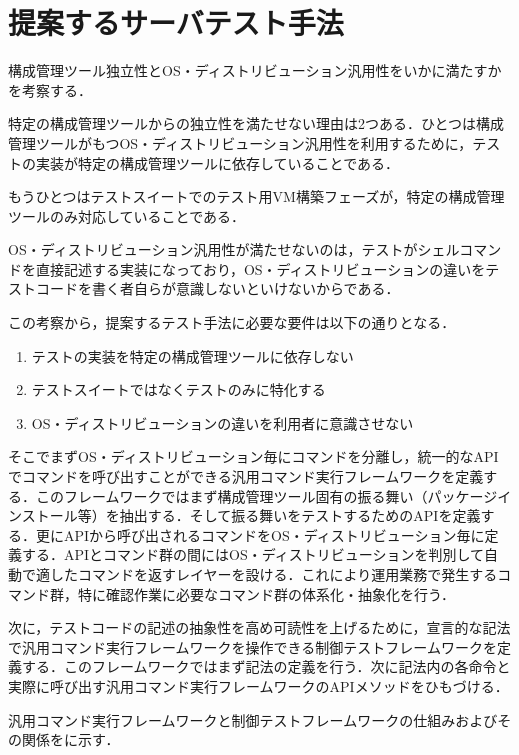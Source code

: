 \section{提案するサーバテスト手法}

構成管理ツール独立性とOS・ディストリビューション汎用性をいかに満たすかを考察する．

特定の構成管理ツールからの独立性を満たせない理由は2つある．ひとつは構成管理ツールがもつOS・ディストリビューション汎用性を利用するために，テストの実装が特定の構成管理ツールに依存していることである．

もうひとつはテストスイートでのテスト用VM構築フェーズが，特定の構成管理ツールのみ対応していることである．

OS・ディストリビューション汎用性が満たせないのは，テストがシェルコマンドを直接記述する実装になっており，OS・ディストリビューションの違いをテストコードを書く者自らが意識しないといけないからである．

この考察から，提案するテスト手法に必要な要件は以下の通りとなる．

\begin{enumerate}
  \item テストの実装を特定の構成管理ツールに依存しない
  \item テストスイートではなくテストのみに特化する
  \item OS・ディストリビューションの違いを利用者に意識させない
\end{enumerate}

そこでまずOS・ディストリビューション毎にコマンドを分離し，統一的なAPIでコマンドを呼び出すことができる汎用コマンド実行フレームワークを定義する．このフレームワークではまず構成管理ツール固有の振る舞い（パッケージインストール等）を抽出する．そして振る舞いをテストするためのAPIを定義する．更にAPIから呼び出されるコマンドをOS・ディストリビューション毎に定義する．APIとコマンド群の間にはOS・ディストリビューションを判別して自動で適したコマンドを返すレイヤーを設ける．これにより運用業務で発生するコマンド群，特に確認作業に必要なコマンド群の体系化・抽象化を行う．

次に，テストコードの記述の抽象性を高め可読性を上げるために，宣言的な記法で汎用コマンド実行フレームワークを操作できる制御テストフレームワークを定義する．このフレームワークではまず記法の定義を行う．次に記法内の各命令と実際に呼び出す汎用コマンド実行フレームワークのAPIメソッドをひもづける．

汎用コマンド実行フレームワークと制御テストフレームワークの仕組みおよびその関係をに示す．

